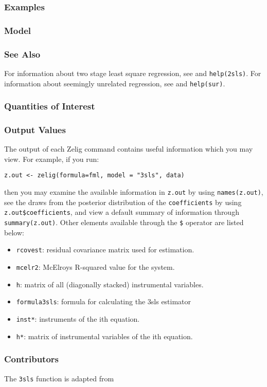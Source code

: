 \documentclass[12pt]{book}%
\begin{document}
\subsubsection{Examples}
\subsubsection{Model}
\subsubsection{See Also}
For information about two stage least square regression, see 
 and \texttt{help(2sls)}.
For information about seemingly unrelated regression, see
 and \texttt{help(sur)}.
\subsubsection{Quantities of Interest}
\subsubsection{Output Values}
The output of each Zelig command contains useful information which you may
view. For example, if you run:
\begin{verbatim}
z.out <- zelig(formula=fml, model = "3sls", data)
\end{verbatim}
\noindent then you may examine the available information in \texttt{z.out} by
using \texttt{names(z.out)}, see the draws from the posterior distribution of
the \texttt{coefficients} by using \texttt{z.out\$coefficients}, and view a default
summary of information through \texttt{summary(z.out)}. Other elements
available through the \texttt{\$} operator are listed below:
\begin{itemize}
\item \texttt{rcovest}: residual covariance matrix used for estimation.
\item \texttt{mcelr2}: McElroys R-squared value for the system.
\item \texttt{h}: matrix of all (diagonally stacked) instrumental variables.
\item \texttt{formula3sls}: formula for calculating the 3sls estimator 
\end{itemize}

\begin{itemize}
\item \texttt{inst*}: instruments of the ith equation.
\item \texttt{h*}: matrix of instrumental variables of the ith equation. 
\end{itemize}
\subsubsection{Contributors}
The \texttt{3sls} function is adapted from 
\end{document}
